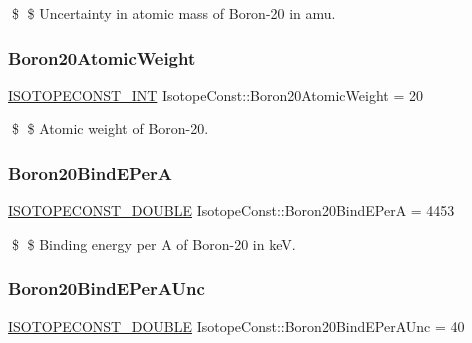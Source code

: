 \$ \$ Uncertainty in atomic mass of Boron-\/20 in amu. \mbox{\label{group___isotope_const-_boron-_b20_ga69dea838e918b19c9cc3e438d7ca9153}} 
\subsubsection{\texorpdfstring{Boron20\+Atomic\+Weight}{Boron20AtomicWeight}}
{\footnotesize\ttfamily \mbox{\hyperlink{group___isotope_const-_macros_ga5f18360b3e99483a35c32d789e62621c}{I\+S\+O\+T\+O\+P\+E\+C\+O\+N\+S\+T\+\_\+\+I\+NT}} Isotope\+Const\+::\+Boron20\+Atomic\+Weight = 20}

\$ \$ Atomic weight of Boron-\/20. \mbox{\label{group___isotope_const-_boron-_b20_ga67bcbe5ce1c98a30b270bd6b8068c6df}} 
\subsubsection{\texorpdfstring{Boron20\+Bind\+E\+PerA}{Boron20BindEPerA}}
{\footnotesize\ttfamily \mbox{\hyperlink{group___isotope_const-_macros_ga8f45a7272ce02c0b4c65c44636ed719a}{I\+S\+O\+T\+O\+P\+E\+C\+O\+N\+S\+T\+\_\+\+D\+O\+U\+B\+LE}} Isotope\+Const\+::\+Boron20\+Bind\+E\+PerA = 4453}

\$ \$ Binding energy per A of Boron-\/20 in keV. \mbox{\label{group___isotope_const-_boron-_b20_ga4fcadb48de3689f6639f6dacb1ef6035}} 
\subsubsection{\texorpdfstring{Boron20\+Bind\+E\+Per\+A\+Unc}{Boron20BindEPerAUnc}}
{\footnotesize\ttfamily \mbox{\hyperlink{group___isotope_const-_macros_ga8f45a7272ce02c0b4c65c44636ed719a}{I\+S\+O\+T\+O\+P\+E\+C\+O\+N\+S\+T\+\_\+\+D\+O\+U\+B\+LE}} Isotope\+Const\+::\+Boron20\+Bind\+E\+Per\+A\+Unc = 40}


